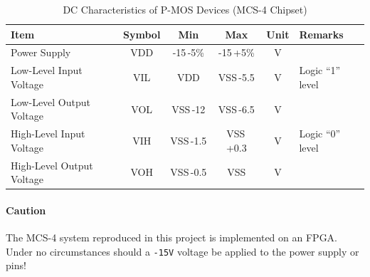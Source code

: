\begin{table}[h]
\centering
\begin{tabular}{|l|c|c|c|c|l|}
\hline
\rowcolor{LightPurple}
\textbf{Item} & \textbf{Symbol} & \textbf{Min} & \textbf{Max} & \textbf{Unit} & \textbf{Remarks} \\
\hline
Power Supply & VDD & -15\,-5\% & -15\,+5\% & V &  \\
Low-Level Input Voltage & VIL & VDD & VSS\,-5.5 & V & Logic ``1'' level \\
Low-Level Output Voltage & VOL & VSS\,-12 & VSS\,-6.5 & V &  \\
High-Level Input Voltage & VIH & VSS\,-1.5 & VSS\,+0.3 & V & Logic ``0'' level \\
High-Level Output Voltage & VOH & VSS\,-0.5 & VSS & V &  \\
\hline
\end{tabular}
\caption{DC Characteristics of P-MOS Devices (MCS-4 Chipset)}
\label{tb:DCCHARPMOS}
\end{table}

\paragraph{\textbf{Caution}}%
The MCS-4 system reproduced in this project is implemented on an FPGA. Under no circumstances should a \texttt{-15V} voltage be applied to the power supply or pins!


